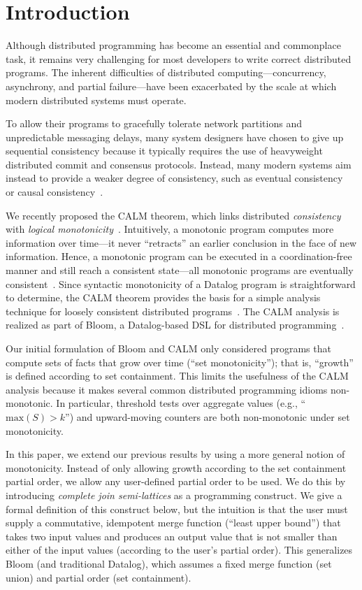 \section{Introduction}
\label{sec:intro}
Although distributed programming has become an essential and commonplace task,
it remains very challenging for most developers to write correct distributed
programs. The inherent difficulties of distributed computing---concurrency,
asynchrony, and partial failure---have been exacerbated by the scale at which
modern distributed systems must operate.

To allow their programs to gracefully tolerate network partitions and
unpredictable messaging delays, many system designers have chosen to give up
sequential consistency because it typically requires the use of heavyweight
distributed commit and consensus protocols. Instead, many modern systems aim
instead to provide a weaker degree of consistency, such as eventual
consistency~\cite{Terry1995} or causal consistency~\cite{Lloyd2011}.

We recently proposed the CALM theorem, which links distributed
\emph{consistency} with \emph{logical
  monotonicity}~\cite{Alvaro2011,Hellerstein2010}. Intuitively, a monotonic
program computes more information over time---it never ``retracts'' an earlier
conclusion in the face of new information. Hence, a monotonic program can be
executed in a coordination-free manner and still reach a consistent state---all
monotonic programs are eventually consistent~\cite{Ameloot2011}.  Since
syntactic monotonicity of a Datalog program is straightforward to determine, the
CALM theorem provides the basis for a simple analysis technique for loosely
consistent distributed programs~\cite{Alvaro2011}. The CALM analysis is realized
as part of Bloom, a Datalog-based DSL for distributed programming~\cite{bloom}.

Our initial formulation of Bloom and CALM only considered programs that compute
sets of facts that grow over time (``set monotonicity''); that is, ``growth'' is
defined according to set containment. This limits the usefulness of the CALM
analysis because it makes several common distributed programming idioms
non-monotonic. In particular, threshold tests over aggregate values (e.g.,
``$\textrm{max}(S) > k$'') and upward-moving counters are both non-monotonic
under set monotonicity.

In this paper, we extend our previous results by using a more general notion of
monotonicity. Instead of only allowing growth according to the set containment
partial order, we allow any user-defined partial order to be used. We do this by
introducing \emph{complete join semi-lattices} as a programming construct. We
give a formal definition of this construct below, but the intuition is that the
user must supply a commutative, idempotent merge function (``least upper
bound'') that takes two input values and produces an output value that is not
smaller than either of the input values (according to the user's partial
order). This generalizes Bloom (and traditional Datalog), which assumes a fixed
merge function (set union) and partial order (set containment).

